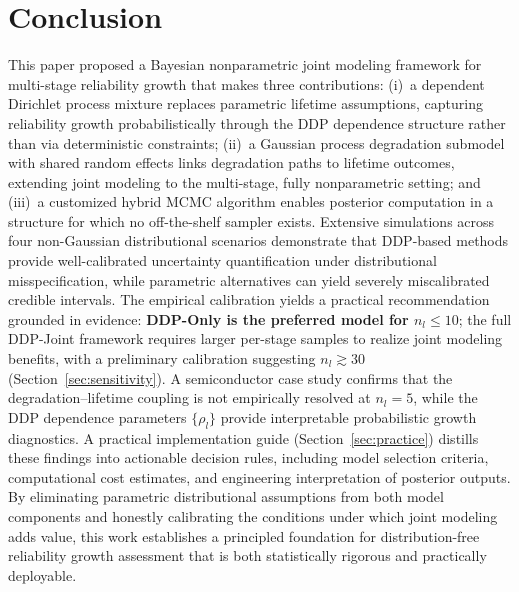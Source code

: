 \documentclass[a4paper,fleqn,longmktitle]{cas-sc}
\begin{document}
\section{Conclusion}
\label{sec:conc}

This paper proposed a Bayesian nonparametric joint modeling framework for multi-stage reliability growth that makes three contributions: (i)~a dependent Dirichlet process mixture replaces parametric lifetime assumptions, capturing reliability growth probabilistically through the DDP dependence structure rather than via deterministic constraints; (ii)~a Gaussian process degradation submodel with shared random effects links degradation paths to lifetime outcomes, extending joint modeling to the multi-stage, fully nonparametric setting; and (iii)~a customized hybrid MCMC algorithm enables posterior computation in a structure for which no off-the-shelf sampler exists. Extensive simulations across four non-Gaussian distributional scenarios demonstrate that DDP-based methods provide well-calibrated uncertainty quantification under distributional misspecification, while parametric alternatives can yield severely miscalibrated credible intervals. The empirical calibration yields a practical recommendation grounded in evidence: \textbf{DDP-Only is the preferred model for $n_l \leq 10$}; the full DDP-Joint framework requires larger per-stage samples to realize joint modeling benefits, with a preliminary calibration suggesting $n_l \gtrsim 30$ (Section~\ref{sec:sensitivity}). A semiconductor case study confirms that the degradation--lifetime coupling is not empirically resolved at $n_l = 5$, while the DDP dependence parameters $\{\rho_l\}$ provide interpretable probabilistic growth diagnostics. A practical implementation guide (Section~\ref{sec:practice}) distills these findings into actionable decision rules, including model selection criteria, computational cost estimates, and engineering interpretation of posterior outputs. By eliminating parametric distributional assumptions from both model components and honestly calibrating the conditions under which joint modeling adds value, this work establishes a principled foundation for distribution-free reliability growth assessment that is both statistically rigorous and practically deployable.

\end{document}
